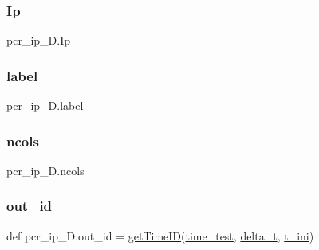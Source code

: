 \mbox{\label{namespacepcr__ip__2D_a585cc4fbd898d4face7a2b37f0ad6636}} 
\subsubsection{\texorpdfstring{Ip}{Ip}}
{\footnotesize\ttfamily pcr\+\_\+ip\+\_\+D.\+Ip}

\mbox{\label{namespacepcr__ip__2D_ac88cc41145d6d402925a1977dd2b3649}} 
\subsubsection{\texorpdfstring{label}{label}}
{\footnotesize\ttfamily pcr\+\_\+ip\+\_\+D.\+label}

\mbox{\label{namespacepcr__ip__2D_a5df90227ec98f758cb9ae27ca0264627}} 
\subsubsection{\texorpdfstring{ncols}{ncols}}
{\footnotesize\ttfamily pcr\+\_\+ip\+\_\+D.\+ncols}

\mbox{\label{namespacepcr__ip__2D_a94fd3b69fd6b2e69c685881382986390}} 
\subsubsection{\texorpdfstring{out\+\_\+id}{out\_id}}
{\footnotesize\ttfamily def pcr\+\_\+ip\+\_\+D.\+out\+\_\+id = \hyperlink{namespacepcr__ip__2D_a5b61f4fcc6e641b5bb012f573b0495b3}{get\+Time\+ID}(\hyperlink{namespacepcr__ip__2D_a2f5bdb13fbded2c22c90cde6e8cc41e7}{time\+\_\+test}, \hyperlink{namespacepcr__ip__2D_a15848a5cc643f9e16f7c40d29f7540df}{delta\+\_\+t}, \hyperlink{namespacepcr__ip__2D_a335b9e411d312c5928c1db82c0cf64cb}{t\+\_\+ini})}

